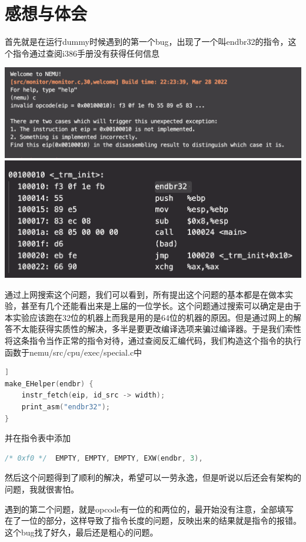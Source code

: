 \documentclass[UTF8,a4paper,10pt]{ctexart}
\begin{document}
\section{感想与体会}
首先就是在运行dummy时候遇到的第一个bug，出现了一个叫endbr32的指令，这个指令通过查阅i386手册没有获得任何信息
\begin{center}
  \includegraphics*[scale = 0.5]{截屏2022-03-29 00.17.26.png}
  \includegraphics*[scale = 0.5]{截屏2022-03-29 00.17.28.png}
\end{center}
通过上网搜索这个问题，我们可以看到，所有提出这个问题的基本都是在做本实验，甚至有几个还能看出来是上届的一位学长。这个问题通过搜索可以确定是由于本实验应该跑在32位的机器上而我是用的是64位的机器的原因。但是通过网上的解答不太能获得实质性的解决，多半是要更改编译选项来骗过编译器。于是我们索性将这条指令当作正常的指令对待，通过查阅反汇编代码，我们构造这个指令的执行函数于nemu/src/cpu/exec/special.c中
\begin{lstlisting}[language
  =C]]  
make_EHelper(endbr) {
    instr_fetch(eip, id_src -> width);
    print_asm("endbr32");
}
\end{lstlisting}
并在指令表中添加
\begin{lstlisting}[language=C]
  /* 0xf0 */  EMPTY, EMPTY, EMPTY, EXW(endbr, 3),
\end{lstlisting}
然后这个问题得到了顺利的解决，希望可以一劳永逸，但是听说以后还会有架构的问题，我就很害怕。

遇到的第二个问题，就是opcode有一位的和两位的，最开始没有注意，全部填写在了一位的部分，这样导致了指令长度的问题，反映出来的结果就是指令的报错。这个bug找了好久，最后还是粗心的问题。
\end{document}
